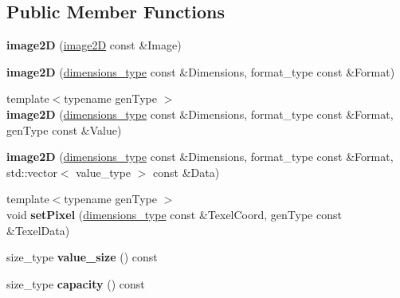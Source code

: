 \subsection*{\-Public \-Member \-Functions}
\begin{DoxyCompactItemize}
\item 
\hypertarget{classgli_1_1image2D_aea0d33dbac156a905e38ef8f0b032618}{{\bfseries image2\-D} (\hyperlink{classgli_1_1image2D}{image2\-D} const \&\-Image)}\label{classgli_1_1image2D_aea0d33dbac156a905e38ef8f0b032618}

\item 
\hypertarget{classgli_1_1image2D_adbd643dc571728f958444bdbcfa8f9b5}{{\bfseries image2\-D} (\hyperlink{structglm_1_1detail_1_1tvec2}{dimensions\-\_\-type} const \&\-Dimensions, format\-\_\-type const \&\-Format)}\label{classgli_1_1image2D_adbd643dc571728f958444bdbcfa8f9b5}

\item 
\hypertarget{classgli_1_1image2D_a39e2a68246f342d5aeb547915ad26315}{{\footnotesize template$<$typename gen\-Type $>$ }\\{\bfseries image2\-D} (\hyperlink{structglm_1_1detail_1_1tvec2}{dimensions\-\_\-type} const \&\-Dimensions, format\-\_\-type const \&\-Format, gen\-Type const \&\-Value)}\label{classgli_1_1image2D_a39e2a68246f342d5aeb547915ad26315}

\item 
\hypertarget{classgli_1_1image2D_a64633c6920d486b3f78982a37e0b4cb5}{{\bfseries image2\-D} (\hyperlink{structglm_1_1detail_1_1tvec2}{dimensions\-\_\-type} const \&\-Dimensions, format\-\_\-type const \&\-Format, std\-::vector$<$ value\-\_\-type $>$ const \&\-Data)}\label{classgli_1_1image2D_a64633c6920d486b3f78982a37e0b4cb5}

\item 
\hypertarget{classgli_1_1image2D_a4c01d40191df582c504d2865d720669e}{{\footnotesize template$<$typename gen\-Type $>$ }\\void {\bfseries set\-Pixel} (\hyperlink{structglm_1_1detail_1_1tvec2}{dimensions\-\_\-type} const \&\-Texel\-Coord, gen\-Type const \&\-Texel\-Data)}\label{classgli_1_1image2D_a4c01d40191df582c504d2865d720669e}

\item 
\hypertarget{classgli_1_1image2D_a957cc11d7249ea4d1f4351dbf182dceb}{size\-\_\-type {\bfseries value\-\_\-size} () const }\label{classgli_1_1image2D_a957cc11d7249ea4d1f4351dbf182dceb}

\item 
\hypertarget{classgli_1_1image2D_af52dd13d2d5908c25f4f1ec941109e27}{size\-\_\-type {\bfseries capacity} () const }\label{classgli_1_1image2D_af52dd13d2d5908c25f4f1ec941109e27}


\end{DoxyCompactItemize}
